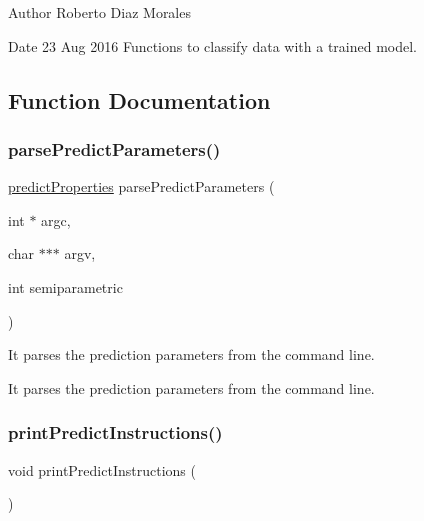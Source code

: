 \begin{DoxyAuthor}{Author}
Roberto Diaz Morales 
\end{DoxyAuthor}
\begin{DoxyDate}{Date}
23 Aug 2016 Functions to classify data with a trained model. 
\end{DoxyDate}


\subsection{Function Documentation}
\hypertarget{LIBIRWLS-predict_8h_ad053dd367164b4b4b39a8f4ce31fe97f}{}\label{LIBIRWLS-predict_8h_ad053dd367164b4b4b39a8f4ce31fe97f} 
\subsubsection{\texorpdfstring{parse\+Predict\+Parameters()}{parsePredictParameters()}}
{\ttfamily \hyperlink{structpredictProperties}{predict\+Properties} parse\+Predict\+Parameters (\begin{DoxyParamCaption}\item[{int $\ast$}]{argc,  }\item[{char $\ast$$\ast$$\ast$}]{argv,  }\item[{int}]{semiparametric }\end{DoxyParamCaption})}



It parses the prediction parameters from the command line. 

It parses the prediction parameters from the command line. \hypertarget{LIBIRWLS-predict_8h_a53efcb64ca8e76d4a2cb65991189af91}{}\label{LIBIRWLS-predict_8h_a53efcb64ca8e76d4a2cb65991189af91} 
\subsubsection{\texorpdfstring{print\+Predict\+Instructions()}{printPredictInstructions()}}
{\ttfamily void print\+Predict\+Instructions (\begin{DoxyParamCaption}{ }\end{DoxyParamCaption})}



